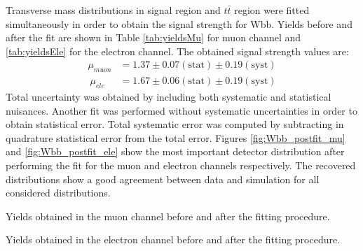 Transverse mass distributions in signal region and $t\bar{t}$ region were fitted simultaneously in order to obtain the signal strength for Wbb. Yields before and after the fit are shown in Table \ref{tab:yieldsMu} for muon channel and \ref{tab:yieldsEle} for the electron channel. The obtained signal strength values are:
\begin{align*}
\mu_{muon} &= 1.37 \pm 0.07\mathrm{(stat)} \pm 0.19 \mathrm{(syst)}\\\
\mu_{ele} &= 1.67 \pm 0.06\mathrm{(stat)} \pm 0.19\mathrm{(syst)}
\end{align*}
Total uncertainty was obtained by including both systematic and statistical nuisances. Another fit was performed without systematic uncertainties in order to obtain statistical error. Total systematic error was computed by subtracting in quadrature statistical error from the total error. 
Figures \ref{fig:Wbb_postfit_mu} and \ref{fig:Wbb_postfit_ele} show the most important detector distribution after performing the fit for the muon and electron channels respectively. The recovered distributions show a good agreement between data and simulation for all considered distributions.

\begin{table}[h!]
\caption{Yields obtained in the muon channel before and after the fitting procedure.}
\label{tab:yieldsMu}

\end{table}
\begin{table}[h!]
\caption{Yields obtained in the electron channel before and after the fitting procedure.}
\label{tab:yieldsEle}

\end{table}

